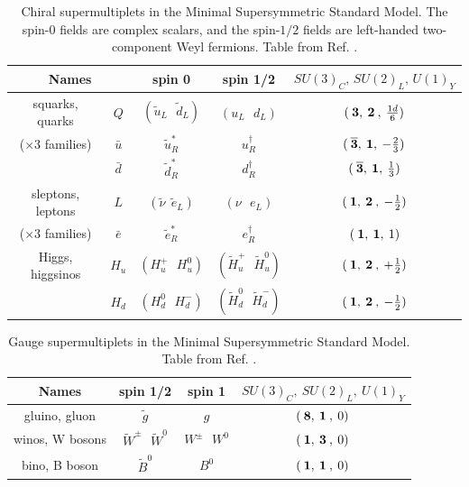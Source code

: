 \renewcommand{\arraystretch}{1.4}
\begin{table}[h]
\begin{center}
\begin{tabular}{c c c c c}
\hline
\multicolumn{2}{c}{Names} 
& spin 0 & spin 1/2 & $SU(3)_C ,\, SU(2)_L ,\, U(1)_Y$
\\  \hline\hline
squarks, quarks & $Q$ & $({\tilde{u}}_L\>\>\>{\tilde{d}}_L )$&
 $(u_L\>\>\>d_L)$ & $(\>{\bf 3},\>{\bf 2}\>,\>{1d\over 6})$
\\
($\times 3$ families) & $\bar{u}$
&${\tilde{u}}^*_R$ & $u^\dagger_R$ & 
$(\>{\bf \overline 3},\> {\bf 1},\> -{2\over 3})$
\\ & $\bar{d}$ &${\tilde{d}}^*_R$ & $d^\dagger_R$ & 
$(\>{\bf \overline 3},\> {\bf 1},\> {1\over 3})$
\\  \hline
sleptons, leptons & $L$ &$({\tilde{\nu}}\>\>{\tilde{e}}_L )$&
 $(\nu\>\>\>e_L)$ & $(\>{\bf 1},\>{\bf 2}\>,\>-{1\over 2})$
\\
($\times 3$ families) & $\bar{e}$
&${\tilde{e}}^*_R$ & $e^\dagger_R$ & $(\>{\bf 1},\> {\bf 1},\>1)$
\\  \hline
Higgs, higgsinos &$H_u$ &$(H_u^+\>\>\>H_u^0 )$&
$(\tilde{H}_u^+ \>\>\> \tilde{H}_u^0)$& 
$(\>{\bf 1},\>{\bf 2}\>,\>+{1\over 2})$
\\ &$H_d$ & $(H_d^0 \>\>\> H_d^-)$ & $(\tilde{H}_d^0 \>\>\> \tilde{H}_d^-)$& 
$(\>{\bf 1},\>{\bf 2}\>,\>-{1\over 2})$
\\  \hline
\end{tabular}
\caption{Chiral supermultiplets in the Minimal Supersymmetric Standard Model.
The spin-$0$ fields are complex scalars, and the spin-$1/2$ fields are 
left-handed two-component Weyl fermions. Table from Ref. \cite{Martin:1997ns}. \label{tab:chiral}}
\vspace{-0.6cm}
\end{center}
\end{table}



\renewcommand{\arraystretch}{1.55}
\begin{table}[h]
\begin{center}
\begin{tabular}{c c c c}
\hline
Names & spin 1/2 & spin 1 & $SU(3)_C, \> SU(2)_L,\> U(1)_Y$\\
\hline\hline
gluino, gluon &$ \tilde{g}$& $g$ & $(\>{\bf 8},\>{\bf 1}\>,\> 0)$
\\
\hline
winos, W bosons & $ \tilde {W}^\pm\>\>\> \tilde {W}^0 $&
 $W^\pm\>\>\> W^0$ & $(\>{\bf 1},\>{\bf 3}\>,\> 0)$
\\
\hline
bino, B boson &$\tilde{B}^0$&
 $B^0$ & $(\>{\bf 1},\>{\bf 1}\>,\> 0)$
\\
\hline
\end{tabular}
\caption{Gauge supermultiplets in
the Minimal Supersymmetric Standard Model. Table from Ref. \cite{Martin:1997ns}. \label{tab:gauge}}
\vspace{-0.45cm}
\end{center}
\end{table}

